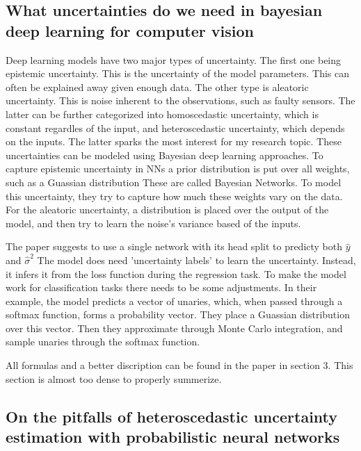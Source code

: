 \documentclass[10pt]{article}
\begin{document}
\subsection*{What uncertainties do we need in bayesian deep learning for computer vision \cite{kendall2017uncertainties}}

Deep learning models have two major types of uncertainty. The first one being epistemic uncertainty.
This is the uncertainty of the model parameters. This can often be explained away given enough data.
The other type is aleatoric uncertainty. This is noise inherent to the observations, such as faulty sensors.
The latter can be further categorized into homoscedastic uncertainty, which is constant regardles of the input,
and heteroscedastic uncertainty, which depends on the inputs. The latter sparks the most interest for my research topic.
These uncertainties can be modeled using Bayesian deep learning approaches.
To capture epistemic uncertainty in NNs a prior distribution is put over all weights, such as a Guassian distribution
These are called Bayesian Networks. To model this uncertainty, they try to capture how much these weights vary on the data.
For the aleatoric uncertainty, a distribution is placed over the output of the model, and then try to learn the noise's variance based of the inputs.


The paper suggests to use a single network with its head split to predicty both $\hat{y}$ and $\hat{\sigma}^2$
The model does need 'uncertainty labels' to learn the uncertainty. Instead, it infers it from the loss function during the regression task.
To make the model work for classification tasks there needs to be some adjustments. In their example, the model predicts a vector of unaries,
which, when passed through a softmax function, forms a probability vector. They place a Guassian distribution over this vector.
Then they approximate through Monte Carlo integration, and sample unaries through the softmax function.

All formulas and a better discription can be found in the paper in section 3. This section is almost too dense to properly summerize.

\subsection*{On the pitfalls of heteroscedastic uncertainty estimation with probabilistic neural networks \cite{seitzer2022pitfalls}}
\end{document}
